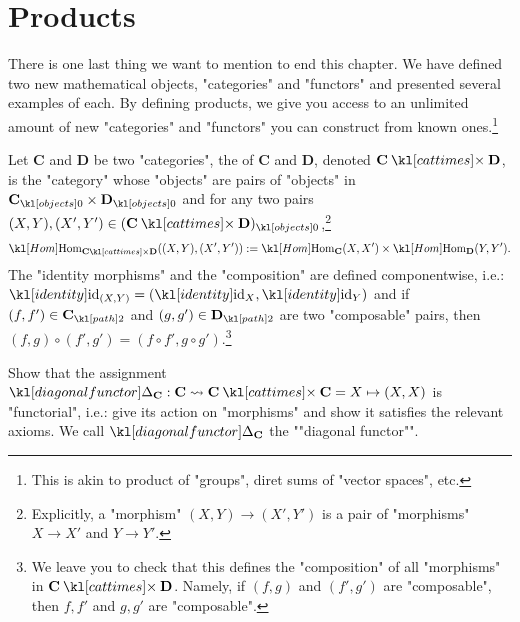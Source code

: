 \documentclass[main.tex]{subfiles}
\begin{document}
\section{Products}
There is one last thing we want to mention to end this chapter. We have defined two new mathematical objects, "categories" and "functors" and presented several examples of each. By defining products, we give you access to an unlimited amount of new "categories" and "functors" you can construct from known ones.\footnote{This is akin to product of "groups", diret sums of "vector spaces", etc.}
\begin{defn}\label{defn:prodcat}
	\AP Let $\mathbf{C}$ and $\mathbf{D}$ be two "categories", the  of $\mathbf{C}$ and $\mathbf{D}$, denoted $\mathbf{C} \cattimes \mathbf{D}$, is the "category" whose "objects" are pairs of "objects" in $\obj{\mathbf{C}}\times \obj{\mathbf{D}}$ and for any two pairs $(X,Y), (X',Y') \in \obj{(\mathbf{C}\cattimes \mathbf{D})}$,\footnote{Explicitly, a "morphism" $(X,Y) \rightarrow (X',Y')$ is a pair of "morphisms" $X \rightarrow X'$ and $Y \rightarrow Y'$.}
	\[\Hom_{\mathbf{C}\cattimes \mathbf{D}}((X,Y),(X',Y')) := \Hom_{\mathbf{C}}(X,X')\times \Hom_{\mathbf{D}}(Y,Y').\]
	The "identity morphisms" and the "composition" are defined componentwise, i.e.: $\id_{(X,Y)} = (\id_X,\id_Y)$ and if $(f,f')\in \mortwo{\mathbf{C}}$ and $(g,g') \in \mortwo{\mathbf{D}}$ are two "composable" pairs, then $(f,g) \circ (f',g') = (f\circ f', g \circ g')$.\footnote{We leave you to check that this defines the "composition" of all "morphisms" in $\mathbf{C} \cattimes \mathbf{D}$. Namely, if $(f,g)$ and $(f',g')$ are "composable", then $f,f'$ and $g,g'$ are "composable".}
\end{defn}
\begin{exer}\label{exer:catfunc:diagfunc}
	Show that the assignment $\diagFunc_{\mathbf{C}} :\mathbf{C} \rightsquigarrow \mathbf{C}\cattimes \mathbf{C} = X \mapsto (X,X)$ is "functorial", i.e.: give its action on "morphisms" and show it satisfies the relevant axioms. We call $\diagFunc_{\mathbf{C}}$ the ""diagonal functor"".
\end{exer}
\end{document}
